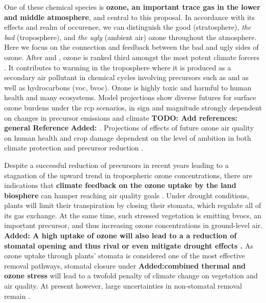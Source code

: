 One of these chemical species is \textbf{ozone, an important trace gas in the lower and middle atmosphere}, and central to this proposal. In accordance with its effects and realm of occurence, we can distinguish the good (stratosphere), \emph{the bad} (troposphere), and \emph{the ugly} (ambient air) ozone throughout the atmosphere. Here we focus on the connection and feedback between the bad and ugly sides of ozone. After  and , ozone is ranked third amongst the most potent climate forcers \parencite{IPCC2013c8}.
It contributes to warming in the troposphere where it is produced as a secondary air pollutant in chemical cycles involving precursors such as  and  as well as hydrocarbons (\gls{voc}, \gls{bvoc}). Ozone is highly toxic and harmful to human health and many ecosystems. Model projections show diverse futures for surface ozone burdens under the \gls{rcp} scenarios, in sign and magnitude strongly dependent on changes in precursor emissions and climate \textbf{\color{red}TODO: Add references: general Reference} \textbf{\color{blue}Added: \parencites{JGR:Rieder2015}{AE:Rieder2018}{Nat:Skeie2020}}. Projections of effects of future ozone air quality on human health and crop damage dependent on the level of ambition in both climate protection and precursor reduction \parencite{PTRS:Schneidemesser2020}.

Despite a successful reduction of precursors in recent years leading to a stagnation of the upward trend in tropospheric ozone concentrations, there are indications that \textbf{climate feedback on the ozone uptake by the land biosphere} can hamper reaching air quality goals \parencite{NCC:Lin2020}. Under drought conditions, plants will limit their transpiration by closing their stomata, which regulate all of its gas exchange. At the same time, such stressed vegetation is emitting \glspl{bvoc}, an important precursor, and thus increasing ozone concentrations \ch{[O_3]} in ground-level air. \textbf{\color{blue}Added: A high uptake of ozone will also lead to a a reduction of stomatal opening and thus rival or even mitigate drought effects \parencite{BGS:Peron2021}.} As ozone uptake through plants’ stomata is considered one of the most effective removal pathways, stomatal closure under \textbf{\color{blue}Added:combined thermal and ozone stress} will lead to a twofold penalty of climate change on vegetation and air quality. At present however, large uncertainties in non-stomatal removal remain \parencite{RG:Clifton2020}.

